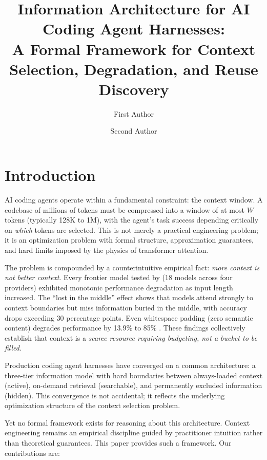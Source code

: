 \documentclass[11pt, a4paper, logo, copyright]{googledeepmind}
\title{Information Architecture for AI Coding Agent Harnesses:\\A Formal Framework for Context Selection, Degradation, and Reuse Discovery}
\author[1]{First Author}
\author[1]{Second Author}
\affil[]{Pragnition Labs}
\affil[1]{Affiliation 1}
\begin{document}
\maketitle

\section{Introduction}
\label{sec:introduction}

AI coding agents operate within a fundamental constraint: the context window. A codebase of millions of tokens must be compressed into a window of at most $W$ tokens (typically 128K to 1M), with the agent's task success depending critically on \emph{which} tokens are selected. This is not merely a practical engineering problem; it is an optimization problem with formal structure, approximation guarantees, and hard limits imposed by the physics of transformer attention.

The problem is compounded by a counterintuitive empirical fact: \emph{more context is not better context}. Every frontier model tested by \citet{chroma2025contextrot} (18 models across four providers) exhibited monotonic performance degradation as input length increased. The ``lost in the middle'' effect \citep{liu2024lost} shows that models attend strongly to context boundaries but miss information buried in the middle, with accuracy drops exceeding 30 percentage points. Even whitespace padding (zero semantic content) degrades performance by 13.9\% to 85\% \citep{du2025context}. These findings collectively establish that context is a \emph{scarce resource requiring budgeting, not a bucket to be filled}.

Production coding agent harnesses have converged on a common architecture: a three-tier information model with hard boundaries between always-loaded context (active), on-demand retrieval (searchable), and permanently excluded information (hidden). This convergence is not accidental; it reflects the underlying optimization structure of the context selection problem.

Yet no formal framework exists for reasoning about this architecture. Context engineering remains an empirical discipline guided by practitioner intuition rather than theoretical guarantees. This paper provides such a framework. Our contributions are:
\end{document}
